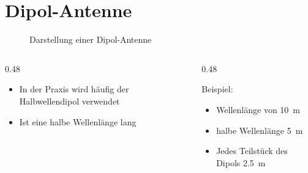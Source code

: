 \section{Dipol-Antenne}
\label{section:dipol}
\begin{frame}%
    \begin{figure}
        \caption{\scriptsize Darstellung einer Dipol-Antenne}
        \label{n_dipol}
    \end{figure}
    \begin{columns}
        \begin{column}{0.48\textwidth}
            \begin{itemize}
                \item In der Praxis wird häufig der Halbwellendipol verwendet
                \item Ist eine halbe Wellenlänge lang
            \end{itemize}
        \end{column}
        \begin{column}{0.48\textwidth}
            \pause
            \begin{exampleblock}{Beispiel:}
                \begin{itemize}
                    \item Wellenlänge von \qty{10}{\metre}
                    \item halbe Wellenlänge \qty{5}{\metre}
                    \item Jedes Teilstück des Dipols \qty{2,5}{\metre}
                \end{itemize}
            \end{exampleblock}
        \end{column}
    \end{columns}
\end{frame}

\begin{frame}
\end{frame}

